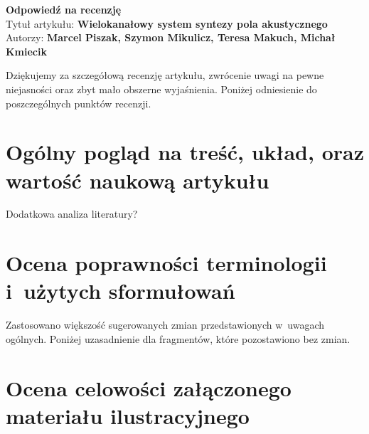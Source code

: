 \documentclass[12pt]{article}
\begin{document}
    \begin{center}
        \textbf{Odpowiedź na recenzję }\\
        \vspace{10pt}
        Tytuł artykułu: \textbf{Wielokanałowy system syntezy pola akustycznego} \\
        Autorzy: \textbf{Marcel Piszak, Szymon Mikulicz, Teresa Makuch, Michał Kmiecik}
    \end{center}

    Dziękujemy za szczegółową recenzję artykułu, zwrócenie uwagi na pewne
    niejasności oraz zbyt mało obszerne wyjaśnienia. Poniżej odniesienie do
    poszczególnych punktów recenzji.

    \section{Ogólny pogląd na treść, układ, oraz wartość naukową artykułu}

    Dodatkowa analiza literatury?

    \section{Ocena poprawności terminologii i~użytych sformułowań}

    Zastosowano większość sugerowanych zmian przedstawionych w~uwagach ogólnych. Poniżej uzasadnienie dla fragmentów, które pozostawiono bez zmian.



    \section{Ocena celowości załączonego materiału ilustracyjnego}

    \textit{}
\end{document}

